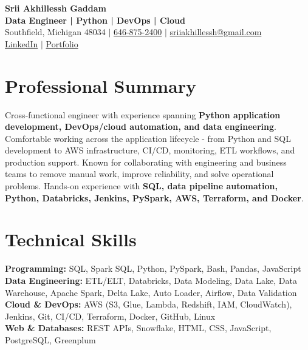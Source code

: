 \documentclass[letterpaper,10pt]{article}
\begin{document}
\fontsize{9.35pt}{10.45pt}\selectfont

\begin{center}
    {\LARGE \textbf{Srii Akhillessh Gaddam}} \\[-1pt]
    \textbf{Data Engineer | Python | DevOps | Cloud} \\[2pt]
    Southfield, Michigan 48034 $|$
    \href{tel:6468752400}{646-875-2400} $|$
    \href{mailto:sriiakhillessh@gmail.com}{sriiakhillessh@gmail.com} \\[1pt]
    \href{https://www.linkedin.com/in/srii-akhiilessh-gaddam-b48668191/}{LinkedIn} $|$
    \href{https://sriiakhillesshg.github.io/portfolio/}{Portfolio}
\end{center}
\vspace{-8pt}

\section{Professional Summary}
\small{Cross-functional engineer with experience spanning \textbf{Python application development, DevOps/cloud automation, and data engineering}. Comfortable working across the application lifecycle - from Python and SQL development to AWS infrastructure, CI/CD, monitoring, ETL workflows, and production support. Known for collaborating with engineering and business teams to remove manual work, improve reliability, and solve operational problems. Hands-on experience with \textbf{SQL, data pipeline automation, Python, Databricks, Jenkins, PySpark, AWS, Terraform, and Docker}.}

\section{Technical Skills}
\small{
\textbf{Programming:} SQL, Spark SQL, Python, PySpark, Bash, Pandas, JavaScript \\
\textbf{Data Engineering:} ETL/ELT, Databricks, Data Modeling, Data Lake, Data Warehouse, Apache Spark, Delta Lake, Auto Loader, Airflow, Data Validation \\
\textbf{Cloud \& DevOps:} AWS (S3, Glue, Lambda, Redshift, IAM, CloudWatch), Jenkins, Git, CI/CD, Terraform, Docker, GitHub, Linux \\
\textbf{Web \& Databases:} REST APIs, Snowflake, HTML, CSS, JavaScript, PostgreSQL, Greenplum
}
\end{document}
